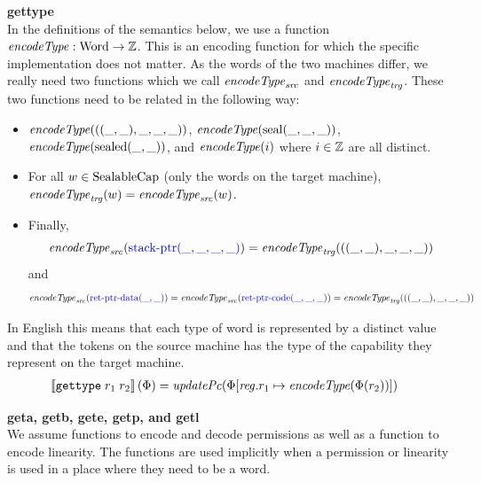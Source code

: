 \documentclass[a4paper]{article}
\begin{document}
\noindent\textbf{gettype}\\
In the definitions of the semantics below, we use a function $\encType{} : \Word \rightarrow \ints$. This is an encoding function for which the specific implementation does not matter. As the words of the two machines differ, we really need two functions which we call $\encType{}_{\var{src}}$ and $\encType{}_{\var{trg}}$. These two functions need to be related in the following way:
\begin{itemize}
\item $\encType{}(((\_,\_),\_,\_,\_))$, $\encType{}(\seal{\_,\_,\_})$, $\encType{}(\sealed{\_,\_})$, and $\encType{}(i)$ where $i\in\mathbb{Z}$ are all distinct.
\item For all $w \in \mathrm{SealableCap}$ (only the words on the target machine), $\encType{}_{\var{trg}}(w) = \encType{}_{\var{src}}(w)$.
\item Finally, 
\[
\encType{}_{\var{src}}(\src{\stkptr{\_,\_,\_,\_}}) = \encType{}_{\var{trg}}(((\_,\_),\_,\_,\_))
\]
 and 
\[
\encType{}_{\var{src}}(\src{\retptrd(\_,\_)}) = \encType{}_{\var{src}}(\src{\retptrc(\_,\_,\_)}) = \encType{}_{\var{trg}}(((\_,\_),\_,\_,\_))
\]
\end{itemize}
In English this means that each type of word is represented by a distinct value and that the tokens on the source machine has the type of the capability they represent on the target machine.
\begin{align*}
  \sem{\tisptr{r_1}{r_2}}(\Phi) = & \; \updPcAddr{}(\Phi\updReg{r_1}{\encType{\Phi(r_2)}})
\end{align*}


\noindent\textbf{geta, getb, gete, getp, and getl}\\
We assume functions to encode and decode permissions as well as a function to encode linearity. The functions are used implicitly when a permission or linearity is used in a place where they need to be a word.
\end{document}
